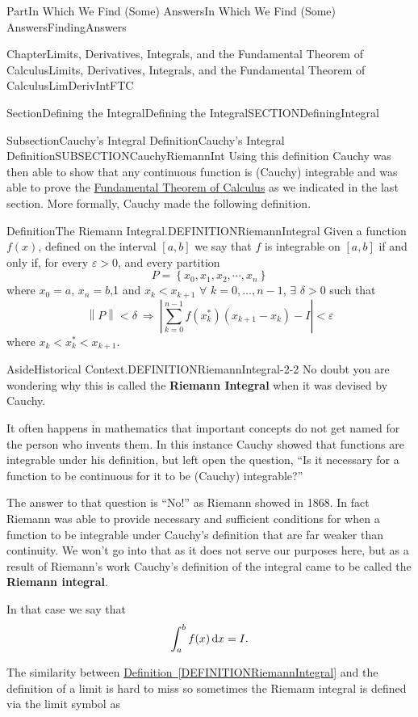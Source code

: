 \documentclass[oneside,10pt,]{book}
\newcommand{\xreffont}{\relax}
\newcommand{\terminology}[1]{\textbf{#1}}
\numberwithin{equation}{part}
\newcommand{\norm}[1]{\left\|#1\right\|}
\newcommand{\imp}{\ \Rightarrow\ }
\newcommand{\dx}[1]{\,{\rm d}#1}
\newcommand{\abs}[1]{\left|#1\right|}
\newcommand{\eps}{\varepsilon}
\newcommand{\lt}{<}
\newcommand{\gt}{>}
\begin{document}
\begin{partptx}{Part}{In Which We Find (Some) Answers}{}{In Which We Find (Some) Answers}{}{}{FindingAnswers}
\begin{chapterptx}{Chapter}{Limits, Derivatives, Integrals, and the Fundamental Theorem of Calculus}{}{Limits, Derivatives, Integrals, and the Fundamental Theorem of Calculus}{}{}{LimDerivIntFTC}
\begin{sectionptx}{Section}{Defining the Integral}{}{Defining the Integral}{}{}{SECTIONDefiningIntegral}
\begin{subsectionptx}{Subsection}{Cauchy's Integral Definition}{}{Cauchy's Integral Definition}{}{}{SUBSECTIONCauchyRiemannInt}
Using this definition Cauchy was then able to show that any continuous function is (Cauchy) integrable and was able to prove the \hyperref[THEOREMFTCCauchy]{Fundamental Theorem of Calculus} as we indicated in the last section. More formally, Cauchy made the following definition.%
\begin{definition}{Definition}{The Riemann Integral.}{DEFINITIONRiemannIntegral}%
Given a function \(f(x)\), defined on the interval \([a,b]\) we say that \(f\) is integrable on \([a,b]\) if and only if, for every \(\eps\gt 0\), and  every partition%
\begin{equation*}
P=\left\{x_0, x_1, x_2, \cdots, x_n\right\} 
\end{equation*}
where \(x_0=a\), \(x_n=b\),1 and \(x_k\lt
x_{k+1}\) \(\forall\) \(k=0,\ldots,n-1\), \(\exists\) \(\delta \gt 0\) such that%
\begin{equation*}
\norm{P}\lt\delta \imp
\abs{\sum^{n-1}_{k=0}{f\left(x_k^*\right)\left(x_{k+1}-x_k\right)}-I}\lt
\eps 
\end{equation*}
where \(x_k\lt{}x_k^*\lt x_{k+1}\).%
\begin{aside}{Aside}{Historical Context.}{DEFINITIONRiemannIntegral-2-2}%
No doubt you are wondering why this is called the \terminology{Riemann Integral} when it was devised by Cauchy.%
\par
It often happens in mathematics that important concepts do not get named for the person who invents them. In this instance Cauchy showed that functions are integrable  under his definition, but left open the question, ``Is it necessary for a function to be continuous for it to be (Cauchy) integrable?''%
\par
The answer to that question is ``No!'' as Riemann showed in 1868. In fact Riemann was able to provide necessary and sufficient conditions for when a function to be integrable under Cauchy's definition that are far weaker than continuity.  We won't go into that as it does not serve our purposes here, but as a result of Riemann's work Cauchy's definition of the integral came to be called the \terminology{Riemann integral}.%
\par
In that case we say that%
\begin{equation*}
\int_a^b f(x)\dx{x} =I\text{.}
\end{equation*}
%
\end{aside}
\end{definition}
The similarity between \hyperref[DEFINITIONRiemannIntegral]{Definition~{\xreffont\ref{DEFINITIONRiemannIntegral}}}  and the definition of a limit is hard to miss so sometimes the Riemann integral is defined via the limit symbol as%

\end{subsectionptx}
\end{sectionptx}
\end{chapterptx}
\end{partptx}
\end{document}
